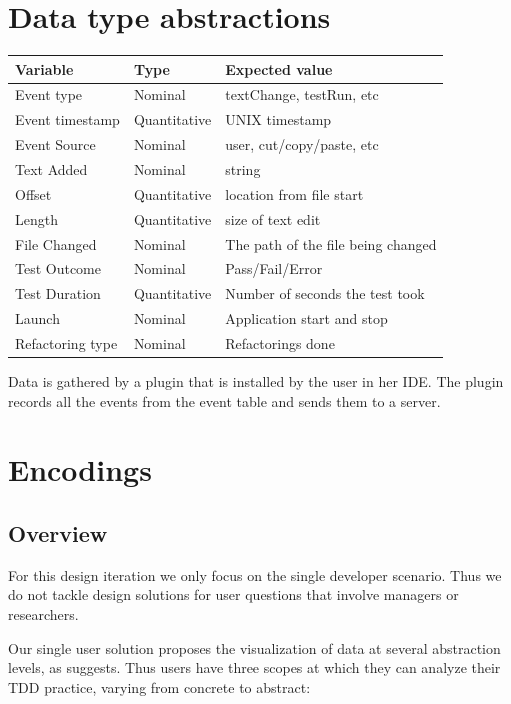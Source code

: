\documentclass[journal]{vgtc}                %
\begin{document}
\section{Data type abstractions}

\begin{table}[hbt]
\begin{tabular}{l l l}
\toprule
Variable & Type & Expected value \\
\midrule
Event type & Nominal & textChange, testRun, etc \\
Event timestamp & Quantitative & UNIX timestamp \\
Event Source & Nominal & user, cut/copy/paste, etc \\
Text Added & Nominal & string \\
Offset & Quantitative & location from file start \\
Length & Quantitative & size of text edit \\
File Changed & Nominal & The path of the file being changed \\
Test Outcome & Nominal & Pass/Fail/Error \\
Test Duration & Quantitative & Number of seconds the test took \\
Launch & Nominal & Application start and stop \\
Refactoring type & Nominal & Refactorings done \\
\bottomrule
\end{tabular}
\end{table}

Data is gathered by a plugin that is installed by the user in her IDE. The plugin records all the events from the event table and sends them to a server.

\section{Encodings}

\subsection{Overview}

For this design iteration we only focus on the single developer scenario. Thus we do not tackle design solutions for user questions that involve managers or researchers.

Our single user solution proposes the visualization of data at several abstraction levels, as \cite{two} suggests. Thus users have three scopes at which they can analyze their TDD practice, varying from concrete to abstract:
\end{document}
